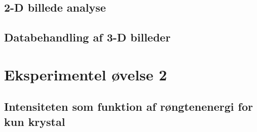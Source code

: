 \documentclass[a4paper,twoside]{article}
\begin{document}
\section{2-D billede analyse}

\section{Databehandling af 3-D billeder} 

\chapter{Eksperimentel øvelse 2}


\section{Intensiteten som funktion af røngtenenergi for kun krystal}
\end{document}
